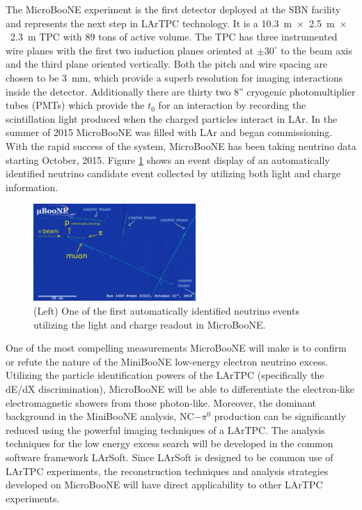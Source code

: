 \label{sec:IF_MicroBooNE}
The MicroBooNE experiment is the first detector deployed at the SBN facility and represents the next step in LArTPC technology. It is a 10.3~m~$\times$~2.5~m~$\times$~2.3~m TPC with 89 tons of active volume. The TPC has three instrumented wire planes with the first two induction planes oriented at $\pm 30^{\circ}$ to the beam axis and the third plane oriented vertically. Both the pitch and wire spacing are chosen to be 3~mm, which provide a superb resolution for imaging interactions inside the detector. Additionally there are thirty two 8'' cryogenic photomultiplier tubes (PMTs) which provide the $t_{0}$ for an interaction by recording the scintillation light produced when the charged particles interact in LAr. In the summer of 2015 MicroBooNE was filled with LAr and began commissioning.  With the rapid success of the system, MicroBooNE has been taking neutrino data starting October, 2015. Figure \ref{fig:uboone} shows an event display of an automatically identified neutrino candidate event collected by utilizing both light and charge information. 

\begin{figure}[htb]
\centering
\includegraphics[width=0.55\textwidth]{images/ubooneNeutrino.png}
\caption[]{(Left) One of the first automatically identified neutrino events utilizing the light and charge readout in MicroBooNE.}
\label{fig:uboone}
\end{figure}

One of the most compelling measurements MicroBooNE will make is to confirm or refute the nature of the MiniBooNE low-energy electron neutrino excess. Utilizing the particle identification powers of the LArTPC (specifically the dE/dX discrimination), MicroBooNE will be able to differentiate the electron-like electromagnetic showers from those photon-like. Moreover, the dominant background in the MiniBooNE analysis, NC$-\pi^{0}$ production can be significantly reduced using the powerful imaging techniques of a LArTPC. The analysis techniques for the low energy excess search will be developed in the common software framework LArSoft. Since LArSoft is designed to be common use of LArTPC experiments, the reconstruction techniques and analysis strategies developed on MicroBooNE will have direct applicability to other LArTPC experiments.

